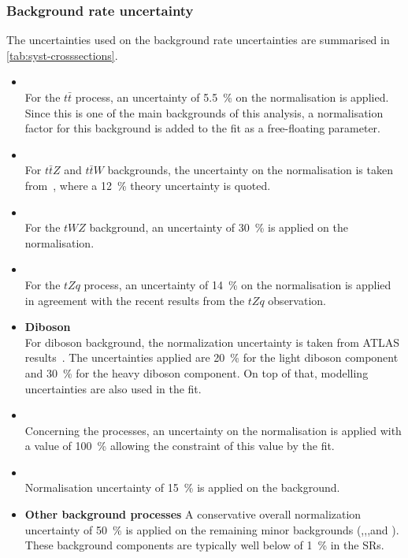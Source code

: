 \subsubsection{Background rate uncertainty} 
The uncertainties used on the background rate uncertainties are summarised in
\cref{tab:syst-crosssections}.
\begin{itemize}
	\item \textbf{\ttbar} \\
	For the $t\bar{t}$ process, an uncertainty of \SI{5.5}{\%} on the normalisation is applied. Since this is one of the main backgrounds of this analysis, a normalisation factor for this background is added to the fit as a free-floating parameter.
	\item \textbf{\ttV} \\
	For $t\bar{t}Z$ and $t\bar{t}W$ backgrounds, the uncertainty on the normalisation is taken from~\cite{ATL-COM-PHYS-2018-140}, where a \SI{12}{\%} theory uncertainty is quoted.
	\item \textbf{\tWZ} \\
	For the $tWZ$ background, an uncertainty of \SI{30}{\%} is applied on the normalisation.
	\item \textbf{\tZq} \\
	For the $tZq$ process, an uncertainty of \SI{14}{\%} on the normalisation is applied in agreement with the recent results from the $tZq$ observation.
	\item \textbf{Diboson} \\
	For diboson background, the normalization uncertainty is taken from ATLAS results~\cite{STDM-2018-03}. The uncertainties applied are \SI{20}{\%} for the light diboson component and \SI{30}{\%} for the heavy diboson component. On top of that, modelling uncertainties are also used in the fit.
	\item \textbf{\Zjets} \\
	Concerning the \Zjets processes, an uncertainty on the normalisation is applied with a value of \SI{100}{\%} allowing the constraint of this value by the fit.
	\item \textbf{\ttH} \\
	Normalisation uncertainty of \SI{15}{\%} is applied on the \ttH background. 
	\item \textbf{Other background processes} 
	A conservative overall normalization uncertainty of \SI{50}{\%} is applied
	on the remaining minor backgrounds (\ttt,\tttt,\VVV,\VH and \ttWW). 
	These background components are typically well below of \SI{1}{\%} in the SRs.
\end{itemize}

